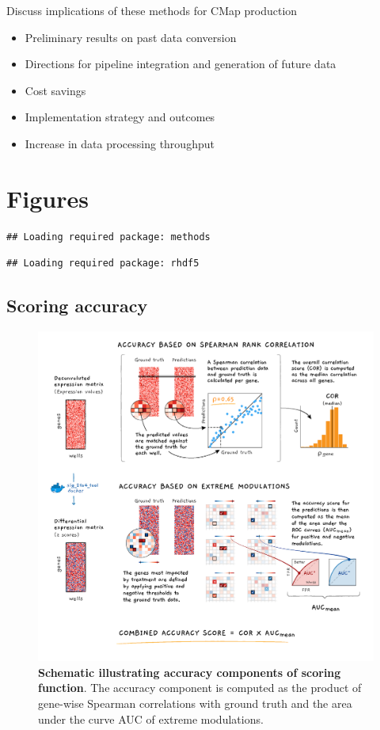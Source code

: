 \documentclass[]{article}
\providecommand{\tightlist}{%
  \setlength{\itemsep}{0pt}\setlength{\parskip}{0pt}}
\begin{document}
Discuss implications of these methods for CMap production

\begin{itemize}
\tightlist
\item
  Preliminary results on past data conversion
\item
  Directions for pipeline integration and generation of future data
\item
  Cost savings
\item
  Implementation strategy and outcomes
\item
  Increase in data processing throughput
\end{itemize}

\hypertarget{figures}{%
\section{Figures}\label{figures}}

\begin{verbatim}
## Loading required package: methods
\end{verbatim}

\begin{verbatim}
## Loading required package: rhdf5
\end{verbatim}

\hypertarget{scoring-accuracy}{%
\subsection{Scoring accuracy}\label{scoring-accuracy}}

\begin{figure}
\centering
\includegraphics{figures/deconvolution_contest Fig2_Final_revised.png}
\caption{\textbf{Schematic illustrating accuracy components of scoring
function}. The accuracy component is computed as the product of
gene-wise Spearman correlations with ground truth and the area under the
curve AUC of extreme modulations.}
\end{figure}
\end{document}
